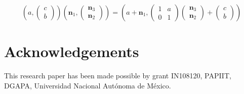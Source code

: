 \documentclass[A4paper,11pt]{amsart}
\theoremstyle{definition}
\theoremstyle{named}
\begin{document}
 \begin{equation}\left(a,\begin{pmatrix}c\\b\end{pmatrix}\right)
 \left(\mathbf{n}_1,\begin{pmatrix}\mathbf{n}_3\\\mathbf{n}_2\end{pmatrix}\right)=
 \left(a+\mathbf{n}_1,\begin{pmatrix}1&a\\0&1\end{pmatrix}\begin{pmatrix}\mathbf{n}_3\\\mathbf{n}_2\end{pmatrix}+\begin{pmatrix}c\\b\end{pmatrix}\right)
 \end{equation}
 
 
 
 
 
 
 
 
 
 
 
 
 
 
 
 
 
  
\vskip10cm
\section{Acknowledgements}

	This research paper has been made possible
		 by grant  IN108120,
		PAPIIT, DGAPA, Universidad Nacional Aut\'onoma de M\'exico.
 
\end{document}
